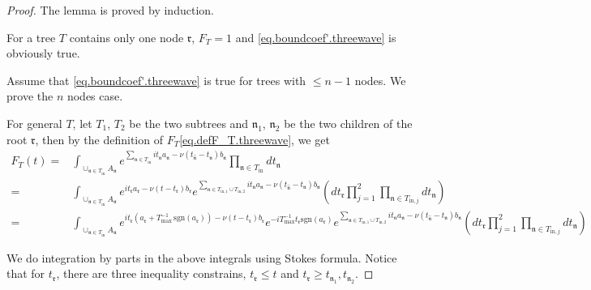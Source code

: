 \begin{proof} The lemma is proved by induction.

For a tree $T$ contains only one node $\mathfrak{r}$, $F_{T}=1$ and \eqref{eq.boundcoef'.threewave} is obviously true.

Assume that \eqref{eq.boundcoef'.threewave} is true for trees with $\le n-1$ nodes. We prove the $n$ nodes case. 

For general $T$, let $T_1$, $T_2$ be the two subtrees and $\mathfrak{n}_1$, $\mathfrak{n}_2$ be the two children of the root $\mathfrak{r}$, then by the definition of $F_T$\eqref{eq.defF_T.threewave}, we get
\begin{equation}\label{eq.lemboundcoef'1.threewave}
\begin{split}
    F_{T}(t)=&\int_{\cup_{\mathfrak{n}\in T_{\text{in}}} A_{\mathfrak{n}}} e^{\sum_{\mathfrak{n}\in T_{\text{in}}}it_{\mathfrak{n}} a_{\mathfrak{n}} - \nu(t_{\widehat{\mathfrak{n}}}-t_{\mathfrak{n}})b_{\mathfrak{n}}} \prod_{\mathfrak{n}\in T_{\text{in}}} dt_{\mathfrak{n}}    
    \\
    =&\int_{\cup_{\mathfrak{n}\in T_{\text{in}}} A_{\mathfrak{n}}}e^{it_{\mathfrak{r}} a_{\mathfrak{r}} - \nu(t-t_{\mathfrak{r}})b_{\mathfrak{r}}} e^{\sum_{\mathfrak{n}\in T_{\text{in},1}\cup T_{\text{in},2}} it_{\mathfrak{n}} a_{\mathfrak{n}} - \nu(t_{\widehat{\mathfrak{n}}}-t_{\mathfrak{n}})b_{\mathfrak{n}}}  \left(dt_{\mathfrak{r}}\prod_{j=1}^2\prod_{\mathfrak{n}\in T_{\text{in},j}}dt_{\mathfrak{n}}  \right)
    \\
    =&\int_{\cup_{\mathfrak{n}\in T_{\text{in}}} A_{\mathfrak{n}}}e^{it_{\mathfrak{r}}(a_{\mathfrak{r}}+T^{-1}_{\text{max}}\, \text{sgn}(a_{\mathfrak{r}}))- \nu(t-t_{\mathfrak{r}})b_{\mathfrak{r}}} e^{-iT^{-1}_{\text{max}}t_{\mathfrak{r}} \text{sgn}(a_{\mathfrak{r}})} e^{\sum_{\mathfrak{n}\in T_{\text{in},1}\cup T_{\text{in},2}} it_{\mathfrak{n}} a_{\mathfrak{n}} - \nu(t_{\widehat{\mathfrak{n}}}-t_{\mathfrak{n}})b_{\mathfrak{n}}}  \left(dt_{\mathfrak{r}}\prod_{j=1}^2\prod_{\mathfrak{n}\in T_{\text{in},j}}dt_{\mathfrak{n}}  \right)
\end{split}
\end{equation}



We do integration by parts in the above integrals using Stokes formula. Notice that for $t_{\mathfrak{r}}$, there are three inequality constrains, $t_{\mathfrak{r}}\le t$ and $t_{\mathfrak{r}}\ge t_{\mathfrak{n}_1},t_{\mathfrak{n}_2}$. 



\end{proof}
